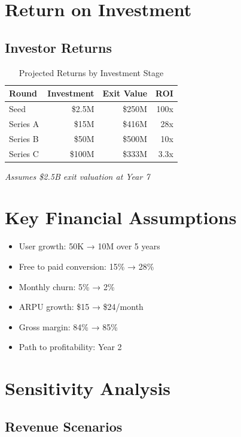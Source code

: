 \section{Return on Investment}

\subsection{Investor Returns}

\begin{table}[H]
\centering
\caption{Projected Returns by Investment Stage}
\begin{tabular}{|l|r|r|r|}
\hline
\rowcolor{lightgray}
\textbf{Round} & \textbf{Investment} & \textbf{Exit Value} & \textbf{ROI} \\
\hline
Seed & \$2.5M & \$250M & 100x \\
\hline
Series A & \$15M & \$416M & 28x \\
\hline
Series B & \$50M & \$500M & 10x \\
\hline
Series C & \$100M & \$333M & 3.3x \\
\hline
\end{tabular}
\end{table}

\textit{Assumes \$2.5B exit valuation at Year 7}

\section{Key Financial Assumptions}

\begin{itemize}
    \item User growth: 50K → 10M over 5 years
    \item Free to paid conversion: 15\% → 28\%
    \item Monthly churn: 5\% → 2\%
    \item ARPU growth: \$15 → \$24/month
    \item Gross margin: 84\% → 85\%
    \item Path to profitability: Year 2
\end{itemize}

\section{Sensitivity Analysis}

\subsection{Revenue Scenarios}

